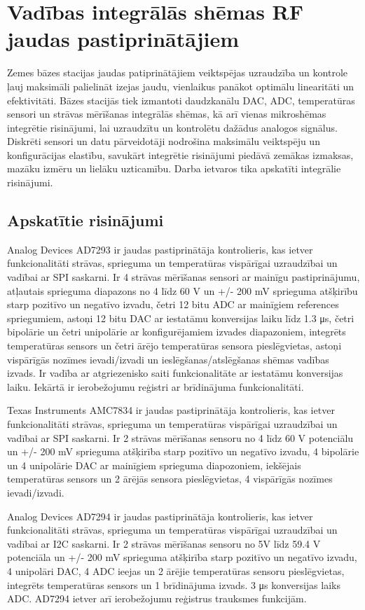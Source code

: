 \section{Vadības integrālās shēmas RF jaudas pastiprinātājiem}
Zemes bāzes stacijas jaudas patiprinātājiem \cite{DisIntCPA} veiktspējas uzraudzība un kontrole ļauj maksimāli palielināt izejas jaudu, vienlaikus panākot optimālu linearitāti un efektivitāti. Bāzes stacijās tiek izmantoti daudzkanālu DAC, ADC, temperatūras sensori un strāvas mērīšanas integrālās shēmas, kā arī vienas mikroshēmas integrētie risinājumi, lai uzraudzītu un kontrolētu dažādus analogos signālus. Diskrēti sensori un datu pārveidotāji nodrošina maksimālu veiktspēju un konfigurācijas elastību, savukārt integrētie risinājumi piedāvā zemākas izmaksas, mazāku izmēru un lielāku uzticamību. Darba ietvaros tika apskatīti integrālie risinājumi.

\subsection{Apskatītie risinājumi}

Analog Devices AD7293\cite{ad7293} ir jaudas pastiprinātāja kontrolieris, kas ietver funkcionalitāti strāvas, sprieguma un temperatūras vispārīgai uzraudzībai un vadībai ar SPI saskarni. Ir 4 strāvas mērīšanas sensori ar mainīgu pastiprinājumu, atļautais sprieguma diapazons no 4 līdz 60 V un +/- 200 mV sprieguma atšķirību starp pozitīvo un negatīvo izvadu, četri 12 bitu ADC ar mainīgiem references spriegumiem, astoņi 12 bitu DAC ar iestatāmu konversijas laiku līdz 1.3 μs, četri bipolārie un četri unipolārie ar konfigurējamiem izvades diapazoniem, integrēts temperatūras sensors un četri ārējo temperatūras sensora pieslēgvietas, astoņi vispārīgās nozīmes ievadi/izvadi un ieslēgšanas/atslēgšanas shēmas vadības izvads. Ir vadība ar atgriezenisko saiti funkcionalitāte ar iestatāmu konversijas laiku. Iekārtā ir ierobežojumu reģistri ar brīdinājuma funkcionalitāti.

Texas Instruments AMC7834\cite{amc7834} ir jaudas pastiprinātāja kontrolieris, kas ietver funkcionalitāti strāvas, sprieguma un temperatūras vispārīgai uzraudzībai un vadībai ar SPI saskarni. Ir 2 strāvas mērīšanas sensoru no 4 līdz 60 V potenciālu un +/- 200 mV sprieguma atšķirība starp pozitīvo un negatīvo izvadu, 4 bipolārie un 4 unipolārie DAC ar mainīgiem sprieguma diapozoniem, iekšējais temperatūras sensors un 2 ārējās sensora pieslēgvietas, 4 vispārīgās nozīmes ievadi/izvadi. 

Analog Devices AD7294\cite{ad7294} ir jaudas pastiprinātāja kontrolieris, kas ietver funkcionalitāti strāvas, sprieguma un temperatūras vispārīgai uzraudzībai un vadībai ar I2C saskarni. Ir 2 strāvas mērīšanas sensoru no 5V līdz 59.4 V potenciāla un +/- 200 mV sprieguma atšķirība starp pozitīvo un negatīvo izvadu, 4 unipolāri DAC, 4 ADC ieejas un 2 ārējie temperatūras sensoru pieslēgvietas, integrēts temperatūras sensors un 1 brīdinājuma izvads. 3 μs konversijas laiks ADC. AD7294 ietver arī ierobežojumu reģistrus trauksmes funkcijām.


